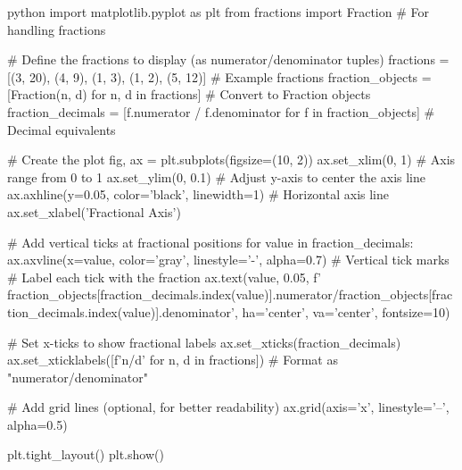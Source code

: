 python
import matplotlib.pyplot as plt
from fractions import Fraction  # For handling fractions

# Define the fractions to display (as numerator/denominator tuples)
fractions = [(3, 20), (4, 9), (1, 3), (1, 2), (5, 12)]  # Example fractions
fraction_objects = [Fraction(n, d) for n, d in fractions]  # Convert to Fraction objects
fraction_decimals = [f.numerator / f.denominator for f in fraction_objects]  # Decimal equivalents

# Create the plot
fig, ax = plt.subplots(figsize=(10, 2))
ax.set_xlim(0, 1)  # Axis range from 0 to 1
ax.set_ylim(0, 0.1)  # Adjust y-axis to center the axis line
ax.axhline(y=0.05, color='black', linewidth=1)  # Horizontal axis line
ax.set_xlabel('Fractional Axis')

# Add vertical ticks at fractional positions
for value in fraction_decimals:
    ax.axvline(x=value, color='gray', linestyle='-', alpha=0.7)  # Vertical tick marks
    # Label each tick with the fraction
    ax.text(value, 0.05, f' {fraction_objects[fraction_decimals.index(value)].numerator}/{fraction_objects[fraction_decimals.index(value)].denominator}', 
            ha='center', va='center', fontsize=10)

# Set x-ticks to show fractional labels
ax.set_xticks(fraction_decimals)
ax.set_xticklabels([f'{n}/{d}' for n, d in fractions])  # Format as "numerator/denominator"

# Add grid lines (optional, for better readability)
ax.grid(axis='x', linestyle='--', alpha=0.5)

plt.tight_layout()
plt.show()